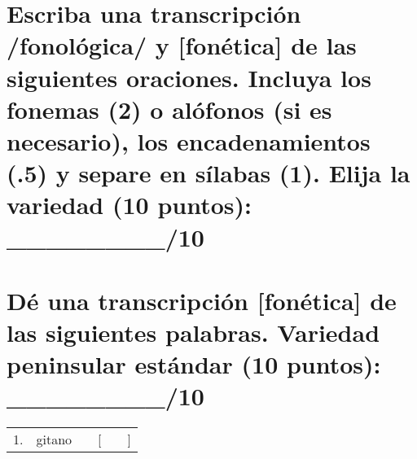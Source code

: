 \documentclass[12pt]{exam}
\begin{document}
\vspace{.2in}

\section{Escriba una transcripción /fonológica/ y [fonética] de las siguientes oraciones. Incluya los fonemas (2) o alófonos (si es necesario), los encadenamientos (.5) y separe en sílabas (1). Elija la variedad (10 puntos): \_\_\_\_\_\_\_\_/10 }

\vspace{.2in}

\section{Dé una transcripción [fonética] de las siguientes palabras. Variedad peninsular estándar (10 puntos): \_\_\_\_\_\_\_\_/10 } %

	\renewcommand{\arraystretch}{1.5}
	\begin{tabular}{lllllr}
		1.  & gitano        & & [ &  \phantom{hello world, hello world} & ] \\
	\end{tabular}
\end{document}
